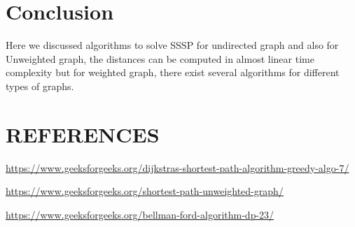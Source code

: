 \documentclass[conference]{IEEEtran}
\begin{document}
  
\section{Conclusion}
Here we discussed algorithms to solve SSSP for undirected graph and also  for Unweighted graph, the distances can be computed in almost linear time complexity but for weighted graph, there exist several algorithms for different types of graphs.
\section{REFERENCES}
    \item \url{https://www.geeksforgeeks.org/dijkstras-shortest-path-algorithm-greedy-algo-7/}
    \item \url{https://www.geeksforgeeks.org/shortest-path-unweighted-graph/}
    \item \url{https://www.geeksforgeeks.org/bellman-ford-algorithm-dp-23/}
    
\end{document}

